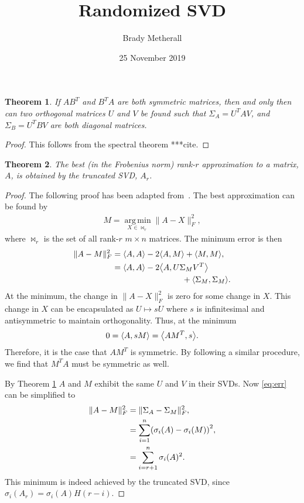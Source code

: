 \documentclass[11pt,a4paper,twocolumn]{article}
\title{Randomized SVD}
\author{Brady Metherall}
\date{25 November 2019}
\let\originalleft\left
\let\originalright\right
\renewcommand{\left}{\mathopen{}\mathclose\bgroup\originalleft}
\renewcommand{\right}{\aftergroup\egroup\originalright}
\DeclareMathOperator{\argmin}{arg\,min}
\newtheorem{theorem}{Theorem}
\begin{document}
\maketitle


\begin{theorem}
\label{thm:symm}
If $AB^T$ and $B^TA$ are both symmetric matrices, then and only then can two orthogonal matrices $U$ and $V$ be found such that $\Sigma_A = U^T A V$, and $\Sigma_B = U^T B V$ are both diagonal matrices.
\end{theorem}
\begin{proof}
This follows from the spectral theorem ***cite.
\end{proof}

\begin{theorem}
The best (in the Frobenius norm) rank-$r$ approximation to a matrix, $A$, is obtained by the truncated SVD, $A_r$.
\end{theorem}
\begin{proof}
The following proof has been adapted from~\cite{eckart}. The best approximation can be found by
\begin{align}
M = \underset{X \in \bowtie_r}{\argmin} \| A - X \|_F^2,
\end{align}
where $\bowtie_r$ is the set of all rank-$r$ $m \times n$ matrices. The minimum error is then
\begin{align}
\label{eq:err}
\| A - M \|_F^2 &= \left< A, A \right> - 2 \left< A, M \right> + \left< M, M \right>, \\
&= \left< A, A \right> - 2 \left< A, U \Sigma_M V^T \right> \\
\nonumber & \hspace{3cm} + \left< \Sigma_M, \Sigma_M \right>.
\end{align}
At the minimum, the change in $\| A - X \|_F^2$ is zero for some change in $X$. This change in $X$ can be encapsulated as $U \mapsto sU$ where $s$ is infinitesimal and antisymmetric to maintain orthogonality. Thus, at the minimum
\begin{align}
0 = \left< A, s M \right> = \left< A M^T, s \right>.
\end{align}
Therefore, it is the case that $A M^T$ is symmetric. By following a similar procedure, we find that $M^T A$ must be symmetric as well.

By Theorem \ref{thm:symm} $A$ and $M$ exhibit the same $U$ and $V$ in their SVDs. Now \eqref{eq:err} can be simplified to
\begin{align}
\| A - M \|_F^2 &= \| \Sigma_A - \Sigma_M \|_F^2, \\
&= \sum_{i=1}^n \left( \sigma_i(A) - \sigma_i(M) \right)^2, \\
&= \sum_{i = r+1}^n \sigma_i(A)^2.
\end{align}
This minimum is indeed achieved by the truncated SVD, since $\sigma_i(A_r) = \sigma_i(A) H(r - i)$.
\end{proof}
\end{document}
